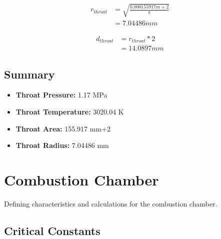 \documentclass[12pt]{report}
\begin{document}
\begin{equation}
\begin{split}
\boldsymbol{\mathit{r_{throat}}} & = \sqrt{\frac{0.000155917 m+2}{\mathit{\pi}}}\\
 & = 7.04486 mm 
\end{split}
\end{equation}


\vspace{10 mm}

\begin{equation}
\begin{split}
\boldsymbol{\mathit{d_{throat}}} & = \boldsymbol{\mathit{r_{throat}}} * 2\\
 & = 14.0897 mm 
\end{split}
\end{equation}






\vspace{10 mm}







\subsection{Summary}

\begin{itemize}
	\item \textbf{Throat Pressure: } 1.17 MPa 
	\item \textbf{Throat Temperature: } 3020.04 K 
	\item \textbf{Throat Area: } 155.917 mm+2  
	\item \textbf{Throat Radius: } 7.04486 mm  
\end{itemize}








\newpage

\section{Combustion Chamber}

Defining characteristics and calculations for the combustion chamber.


\subsection{Critical Constants}
\end{document}
